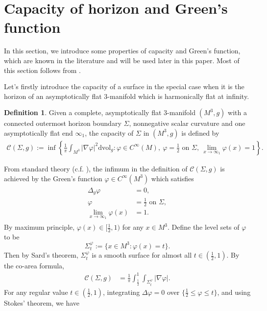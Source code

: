 \documentclass[letter]{amsart}
\theoremstyle{definition}
\newtheorem{defn}{Definition}[section]
\theoremstyle{remark}
\begin{document}
\section{Capacity of horizon and Green's function}\label{capacity}
In this section, we introduce some properties of capacity and Green's function, which are known in the literature and will be used later in this paper. Most of this section follows from \cite{Bray'01}. 

Let's firstly introduce the capacity of a surface in the special case when it is the horizon of an asymptotically flat $3$-manifold which is harmonically flat at infinity. 
\begin{defn}
	Given a complete, asymptotically flat $3$-manifold $(M^3, g)$ with a connected outermost horizon boundary $\Sigma$, nonnegative scalar curvature and one asymptotically flat end $\infty_1$, the capacity of $\Sigma$ in $(M^3,g)$ is defined by
	\begin{align*}
		\mathcal{C}(\Sigma, g) := \inf \left\{ \frac{1}{ \pi } \int_{M^{3}}|\nabla \varphi |^2 \mathrm{dvol}_g: \varphi \in C^{\infty}(M),\ \varphi = \frac{1}{2} \text{ on } \Sigma,\ \lim_{x \to \infty_1}\varphi (x) =1 \right\} .
	\end{align*}
\end{defn}
From standard theory (c.f. \cite{Bartnik'86}), the infimum in the definition of $\mathcal{C}(\Sigma, g)$ is achieved by the Green’s function $\varphi \in C^{\infty}(M^3) $ which satisfies
\begin{align}\label{Green-1end}
	\begin{split}
		\Delta_g \varphi &=0,\\
		\varphi &= \frac{1}{2} \text{ on } \Sigma,\\
		\lim_{x \to \infty_1} \varphi (x) &=1.
	\end{split}
\end{align}
By maximum principle, $\varphi(x) \in [\frac{1}{2}, 1)$ for any $x \in M^3$.
Define the level sets of $\varphi $ to be
$$
\Sigma^{\varphi }_t := \{x \in M^3: \varphi (x) = t\} .
$$ 
Then by Sard's theorem, $\Sigma^{\varphi }_t$ is a smooth surface for almost all $t \in (\frac{1}{2}, 1)$. By the co-area formula, 
\begin{align*}
	\mathcal{C}(\Sigma, g) &= \frac{1}{ \pi } \int_{\frac{1}{2}}^{1} \int_{\Sigma^{\varphi }_t} |\nabla \varphi |.
\end{align*}
For any regular value $t \in (\frac{1}{2}, 1)$, integrating $\Delta \varphi =0$ over $\{\frac{1}{2} \leq \varphi \leq t\} $, and using Stokes' theorem, we have 
\end{document}
